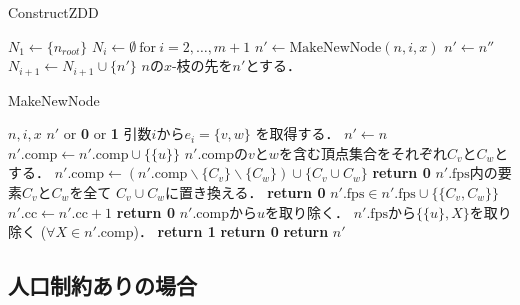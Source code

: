\begin{algorithm}
  \caption{ConstructZDD}
  \label{construct_zdd}
  \begin{algorithmic}[1]
    \State $N_1 \gets \{n_{root}\}$
    \State $N_i \gets \emptyset~\mathrm{for}~i=2, \ldots ,m+1$
          \State $n' \gets \mathrm{MakeNewNode}(n,i,x)$
              \State $n' \gets n''$
            \Else
              \State $N_{i+1} \gets N_{i+1} \cup \{n'\}$
            \EndIf
          \EndIf
          \State $n$の$x$-枝の先を$n'$とする．
        \EndFor
      \EndFor
    \EndFor
  \end{algorithmic}
\end{algorithm}

\begin{breakablealgorithm}
  \caption{MakeNewNode}
  \label{make_new_node}
  \begin{algorithmic}[1]
    \Require $n,i,x$
    \Ensure $n'$ or \textbf{0} or \textbf{1}
    \State 引数$i$から$e_i=\{v,w\}$ を取得する．
    \State $n' \gets n$
        \State $n'.\mathrm{comp} \gets n'.\mathrm{comp} \cup \{\{u\}\}$
      \EndIf
    \EndFor
    \State $n'.\mathrm{comp}$の$v$と$w$を含む頂点集合をそれぞれ$C_v$と$C_w$とする．
      \State $n'.\mathrm{comp} \gets (n'.\mathrm{comp} \backslash \{C_v\} \backslash \{C_w\})
        \cup \{C_v \cup C_w\}$
        \State \textbf{return 0}
      \Else
        \State $n'.\mathrm{fps}$内の要素$C_v$と$C_w$を全て
          $C_v \cup C_w$に置き換える．
      \EndIf
    \Else
        \State \textbf{return 0}
      \Else
        \State $n'.\mathrm{fps} \in n'.\mathrm{fps} \cup \{\{C_v, C_w\}\}$
      \EndIf
    \EndIf
        \State $n'.\mathrm{cc} \gets n'.\mathrm{cc} + 1$
          \State \textbf{return 0}
        \EndIf
      \EndIf
      \State $n'.\mathrm{comp}$から$u$を取り除く．
      \State $n'.\mathrm{fps}$から$\{\{u\},X\}$を取り除く
        ($\forall X \in n'.\mathrm{comp}$)．
    \EndIf
  \EndFor
      \State \textbf{return 1}
    \Else
      \State \textbf{return 0}
    \EndIf
  \EndIf
  \State \textbf{return }$n'$
  \end{algorithmic}
\end{breakablealgorithm}

\subsection{人口制約ありの場合}
